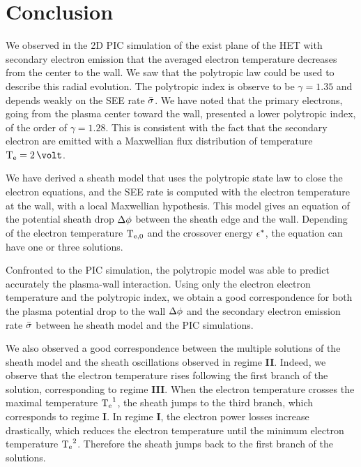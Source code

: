 

\section{Conclusion} \label{subsec-concuslion_ch4}

We observed in the \ac{2D} \ac{PIC} simulation of the exist plane of the \ac{HET} with secondary electron emission that the averaged electron temperature decreases from the center to the wall.
We saw that the polytropic law could be used to describe this radial evolution.
The polytropic index is observe to be $\gamma=1.35$ and depends weakly on the \ac{SEE} rate $ \bar{\sigma }$.
We have noted that the primary electrons, going from the plasma center toward the wall, presented a lower polytropic index, of the order of $\gamma=1.28$.
This is consistent with the fact that the secondary electron are emitted with a Maxwellian flux distribution of temperature $\Te=2\,\volt$.

We have derived a sheath model that uses the polytropic state law to close the electron equations, and the \ac{SEE} rate is computed with the electron temperature at the wall, with a local Maxwellian hypothesis.
This model gives an equation of the potential sheath drop $\Delta \phi$ between the sheath edge and the wall.
Depending of the electron temperature $\mathrm{T_{e, 0}}$ and the crossover energy $\epsilon^{*}$, the equation can have one or three solutions.

Confronted to the \ac{PIC} simulation, the polytropic model was able to predict accurately the plasma-wall interaction.
Using only the electron electron temperature and the polytropic index, we obtain a good correspondence for both the plasma potential drop to the wall $\Delta \phi$ and the secondary electron emission rate $ \bar{\sigma }$ between he sheath model and the \ac{PIC} simulations.

We also observed a good correspondence between the multiple solutions of the sheath model and the sheath oscillations observed in regime {\bf II}.
Indeed, we observe that the electron temperature rises following the first branch of the solution, corresponding to regime {\bf III}.
When the electron temperature crosses the maximal temperature $\mathrm{T_e}^1$, the sheath jumps to the third branch, which corresponds to regime {\bf I}.
In regime {\bf I}, the electron power losses increase drastically, which reduces the electron temperature until the minimum electron temperature $\mathrm{T_e}^2$.
Therefore the sheath jumps back to the first branch of the solutions.

